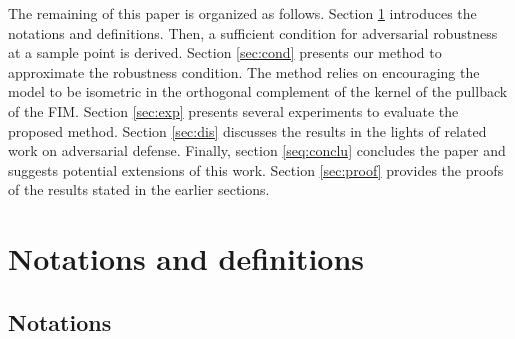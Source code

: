 \documentclass[entropy,article,submit,pdftex,moreauthors]{Definitions/mdpi}
\theoremstyle{plain}
\theoremstyle{definition}
\begin{document}
The remaining of this paper is organized as follows. Section \ref{sec:def} introduces the notations and definitions. Then, a sufficient condition for adversarial robustness at a sample point is derived. Section \ref{sec:cond} presents our method to approximate the robustness condition. The method relies on encouraging the model to be isometric in the orthogonal complement of the kernel of the pullback of the FIM. Section \ref{sec:exp} presents several experiments to evaluate the proposed method. Section \ref{sec:dis} discusses the results in the lights of related work on adversarial defense. Finally, section \ref{seq:conclu} concludes the paper and suggests potential extensions of this work. Section \ref{sec:proof} provides the proofs of the results stated in the earlier sections.


\section{Notations and definitions}
\label{sec:def}

\subsection{Notations}
\end{document}
